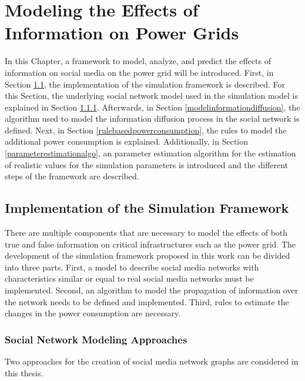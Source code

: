 \chapter{Modeling the Effects of Information on Power Grids}
\label{implementationall}
In this Chapter, a framework to model, analyze, and predict 
the effects of information on social media on the 
power grid will be introduced.
First, in Section \ref{simulationframeworksection}, 
the implementation of the simulation framework is described.
For this Section, the underlying social network model
used in the simulation model is explained in Section \ref{modelsocialnetwork}. Afterwards, in Section 
\ref{modelinformationdiffusion}, the algorithm used to model
the information diffusion process in the social network is 
defined. Next, in Section \ref{rulebasedpowerconsumption}, 
the rules to model the additional power consumption is explained.
Additionally, in Section \ref{parameterestimationalgo},
an parameter estimation algorithm for the estimation of 
realistic values for the simulation parameters is introduced and 
the different steps of the framework are described.

\section{Implementation of the Simulation Framework}
\label{simulationframeworksection}
There are multiple components that are necessary to model the effects of 
both true and false information on critical infrastructures
such as the power grid. The development of the simulation framework
proposed in this work can be divided into three parts. First, a model 
to describe social media networks with characteristics similar 
or equal to real social media networks must be implemented.
Second, an algorithm to model the 
propagation of information over the network needs to be defined and 
implemented. Third, rules to estimate the changes in the power consumption 
are necessary.

\subsection{Social Network Modeling Approaches}
\label{modelsocialnetwork}
Two approaches for the creation of social media network graphs 
are considered in this thesis.

